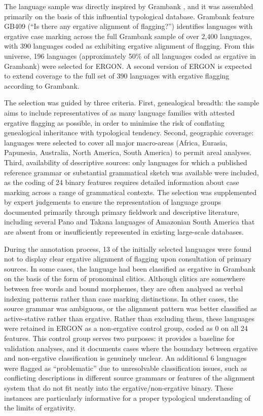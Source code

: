 \documentclass[12pt,a4paper]{article}
\begin{document}
The language sample was directly inspired by Grambank \cite{grambank2023}, and it was assembled primarily on the basis of this influential typological database. Grambank feature GB409 (``Is there any ergative alignment of flagging?'') identifies languages with ergative case marking across the full Grambank sample of over 2,400 languages, with 390 languages coded as exhibiting ergative alignment of flagging. From this universe, 196 languages (approximately 50\% of all languages coded as ergative in Grambank) were selected for ERGON. A second version of ERGON is expected to extend coverage to the full set of 390 languages with ergative flagging according to Grambank.

The selection was guided by three criteria. First, genealogical breadth: the sample aims to include representatives of as many language families with attested ergative flagging as possible, in order to minimise the risk of conflating genealogical inheritance with typological tendency. Second, geographic coverage: languages were selected to cover all major macro-areas (Africa, Eurasia, Papunesia, Australia, North America, South America) to permit areal analyses. Third, availability of descriptive sources: only languages for which a published reference grammar or substantial grammatical sketch was available were included, as the coding of 24 binary features requires detailed information about case marking across a range of grammatical contexts. The selection was supplemented by expert judgements to ensure the representation of language groups documented primarily through primary fieldwork and descriptive literature, including several Pano and Takana languages of Amazonian South America that are absent from or insufficiently represented in existing large-scale databases.

During the annotation process, 13 of the initially selected languages were found not to display clear ergative alignment of flagging upon consultation of primary sources. In some cases, the language had been classified as ergative in Grambank on the basis of the form of pronominal clitics. Although clitics are somewhere between free words and bound morphemes, they are often analysed as verbal indexing patterns rather than case marking distinctions. In other cases, the source grammar was ambiguous, or the alignment pattern was better classified as active-stative rather than ergative. Rather than excluding them, these languages were retained in ERGON as a non-ergative control group, coded as 0 on all 24 features. This control group serves two purposes: it provides a baseline for validation analyses, and it documents cases where the boundary between ergative and non-ergative classification is genuinely unclear. An additional 6 languages were flagged as ``problematic'' due to unresolvable classification issues, such as conflicting descriptions in different source grammars or features of the alignment system that do not fit neatly into the ergative/non-ergative binary. These instances are particularly informative for a proper typological understanding of the limits of ergativity.
\end{document}
